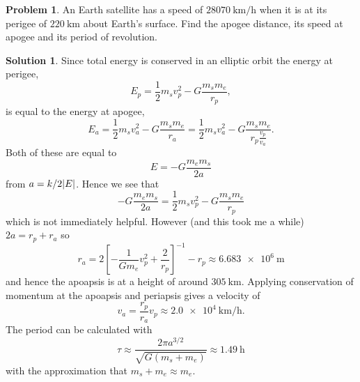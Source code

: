 \documentclass[10pt]{article}
\theoremstyle{definition}
\newtheorem{problem}{Problem}
\newtheorem{soln}{Solution}
\begin{document}
\begin{problem}
An Earth satellite has a speed of $\qty{28070}{\kilo\meter\per\hour}$ when it is at its perigee of $\qty{220}{\kilo\meter}$ about Earth's
surface. Find the apogee distance, its speed at apogee and its period of revolution.
\end{problem}
\begin{soln}
  Since total energy is conserved in an elliptic orbit the energy at perigee,
  $$E_{p}=\frac{1}{2}m_sv_p^2-G\frac{m_sm_e}{r_p},$$
  is equal to the energy at apogee,
  $$E_a=\frac{1}{2}m_sv_a^2-G\frac{m_sm_e}{r_a}=\frac{1}{2}m_sv_a^2-G\frac{m_sm_e}{r_p\frac{v_p}{v_a}}.$$
  Both of these are equal to
  $$E=-G\frac{m_em_s}{2a}$$
  from $a=k/2\abs{E}$.
  Hence we see that
  $$-G\frac{m_em_s}{2a}=\frac{1}{2}m_sv_p^2-G\frac{m_sm_e}{r_p}$$
  which is not immediately helpful. However (and this took me a while)
  $2a=r_p+r_a$ so
  $$r_a=2\left[-\frac{1}{Gm_e}v_p^2+\frac{2}{r_p}\right]^{-1}-r_p\approx \qty{6.683e6}{\meter}$$
  and hence the apoapsis is at a height of around $\qty{305}{\kilo\meter}$. Applying conservation of momentum at the apoapsis and periapsis
  gives a velocity of
  $$v_a=\frac{r_p}{r_a}v_p\approx \qty{2.0 e4}{\kilo\meter\per\hour}.$$
  The period can be calculated with $$\tau \approx \frac{2\pi a^{3/2}}{\sqrt{G(m_s+m_e)}}\approx \qty{1.49}{\hour}$$
  with the approximation that $m_s+m_e\approx m_e$.
\end{soln}



\end{document}
